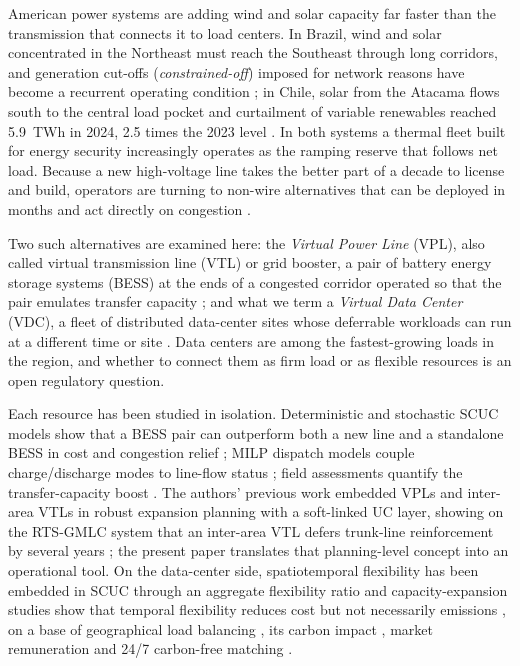 \documentclass[conference]{IEEEtran}
\begin{document}
 American power systems are adding wind and solar capacity far faster than the transmission that connects it to load centers. In Brazil, wind and solar concentrated in the Northeast must reach the Southeast through long corridors, and generation cut-offs (\emph{constrained-off}) imposed for network reasons have become a recurrent operating condition \cite{ons2025curt}; in Chile, solar from the Atacama flows south to the central load pocket and curtailment of variable renewables reached 5.9~TWh in 2024, 2.5 times the 2023 level \cite{cen2025reporte}. In both systems a thermal fleet built for energy security increasingly operates as the ramping reserve that follows net load. Because a new high-voltage line takes the better part of a decade to license and build, operators are turning to non-wire alternatives that can be deployed in months and act directly on congestion \cite{irena2020vpl}.

Two such alternatives are examined here: the \emph{Virtual Power Line} (VPL), also called virtual transmission line (VTL) or grid booster, a pair of battery energy storage systems (BESS) at the ends of a congested corridor operated so that the pair emulates transfer capacity \cite{irena2020vpl,aguero2024,wang2025vt,wang2025stoch,vpl2024epsr,ferreira2025,ferreira2026}; and what we term a \emph{Virtual Data Center} (VDC), a fleet of distributed data-center sites whose deferrable workloads can run at a different time or site \cite{liu2015glb,lindberg2022,zhang2021remunerating,wan2026scuc,riepin2024}. Data centers are among the fastest-growing loads in the region, and whether to connect them as firm load or as flexible resources is an open regulatory question.

Each resource has been studied in isolation. Deterministic and stochastic SCUC models show that a BESS pair can outperform both a new line and a standalone BESS in cost and congestion relief \cite{wang2025vt,wang2025stoch}; MILP dispatch models couple charge/discharge modes to line-flow status \cite{vpl2024epsr}; field assessments quantify the transfer-capacity boost \cite{aguero2024}. The authors' previous work embedded VPLs and inter-area VTLs in robust expansion planning with a soft-linked UC layer, showing on the RTS-GMLC system that an inter-area VTL defers trunk-line reinforcement by several years \cite{ferreira2025,ferreira2026}; the present paper translates that planning-level concept into an operational tool. On the data-center side, spatiotemporal flexibility has been embedded in SCUC through an aggregate flexibility ratio \cite{wan2026scuc} and capacity-expansion studies show that temporal flexibility reduces cost but not necessarily emissions \cite{senga2026}, on a base of geographical load balancing \cite{liu2015glb}, its carbon impact \cite{lindberg2022}, market remuneration \cite{zhang2021remunerating} and 24/7 carbon-free matching \cite{riepin2024}.
\end{document}
